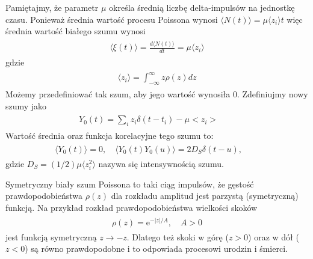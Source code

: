 \documentclass[a4paper,12pt,polish]{sphinxmanual}
\begin{document}
Pamiętajmy, że parametr $\mu$ określa średnią liczbę delta-impulsów na jednostkę czasu. Ponieważ średnia wartość procesu Poissona wynosi $\langle N(t)\rangle = \mu\langle z_i\rangle t$ więc średnia wartość białego szumu wynosi
\label{ch3/chIII031:equation-eqn15}\begin{gather}
\begin{split}\langle \xi(t) \rangle = \frac{d\langle N(t)\rangle }{dt} = \mu \langle z_i\rangle\end{split}\label{ch3/chIII031-eqn15}
\end{gather}
gdzie
\label{ch3/chIII031:equation-eqn16}\begin{gather}
\begin{split}\langle z_i \rangle = \int_{-\infty}^{\infty} z \rho(z) dz\end{split}\label{ch3/chIII031-eqn16}
\end{gather}
Możemy przedefiniować tak szum, aby jego wartość wynosiła 0. Zdefiniujmy nowy szumy jako
\label{ch3/chIII031:equation-eqn17}\begin{gather}
\begin{split}Y_0(t) = \sum\limits_{i} z_i \delta (t-t_i) -\mu <z_i> \qquad\end{split}\label{ch3/chIII031-eqn17}
\end{gather}
Wartość średnia oraz funkcja korelacyjne tego szumu to:
\label{ch3/chIII031:equation-eqn18}\begin{gather}
\begin{split}\langle Y_0(t) \rangle = 0, \quad \langle Y_0(t) Y_0(u) \rangle = 2D_S \delta (t-u), \qquad\end{split}\label{ch3/chIII031-eqn18}
\end{gather}
gdzie $D_S=(1/2)\mu \langle z_i^2 \rangle$ nazywa się intensywnością szumu.

Symetryczny biały szum Poissona to taki ciąg impulsów, że gęstość prawdopodobieństwa $\rho(z)$ dla rozkładu amplitud jest parzystą (symetryczną) funkcją. Na przykład rozkład prawdopodobieństwa wielkości skoków
\label{ch3/chIII031:equation-eqn19}\begin{gather}
\begin{split}\rho(z) = \mbox{e}^{- \vert z \vert /A}, \quad A > 0\end{split}\label{ch3/chIII031-eqn19}
\end{gather}
jest funkcją symetryczną $z \to -z$. Dlatego też skoki w górę ($z>0$) oraz w dół ($z<0$) są równo prawdopodobne i to odpowiada procesowi urodzin i śmierci.
\end{document}
